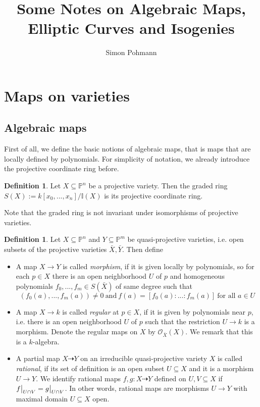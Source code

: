 \documentclass{scrartcl}
\title{Some Notes on Algebraic Maps, Elliptic Curves and Isogenies}
\author{Simon Pohmann}
\newcommand{\I}{\mathbb{I}}
\newcommand{\Proj}{\mathbb{P}}
\newcommand\restr[2]{{
    \left.\kern-\nulldelimiterspace
    #1
    \vphantom{\big|}
    \right|_{#2}
}}
\theoremstyle{definition}
\newtheorem{definition}[prop]{Definition}
\begin{document}
\maketitle

\tableofcontents

\section{Maps on varieties}

\subsection{Algebraic maps}
First of all, we define the basic notions of algebraic maps, that is maps that are locally defined by polynomials.
For simplicity of notation, we already introduce the projective coordinate ring before.
\begin{definition}
    Let $X \subseteq \Proj^n$ be a projective variety. 
    Then the graded ring $S(X) := k[x_0, ..., x_n] / \I(X)$ is its projective coordinate ring.
\end{definition}
Note that the graded ring is not invariant under isomorphisms of projective varieties.
\begin{definition}
    Let $X \subseteq \Proj^n$ and $Y \subseteq \Proj^m$ be quasi-projective varieties, i.e. open subsets of the projective varieties $\bar{X}, \bar{Y}$.
    Then define
    \begin{itemize}
        \item A map $X \to Y$ is called \emph{morphism}, if it is given locally by polynomials, so for each $p \in X$ there is an open neighborhood $U$ of $p$ and homogeneous polynomials $f_0, ..., f_m \in S(\bar{X})$ of same degree such that
        \begin{equation*}
            (f_0(a), ..., f_m(a)) \neq 0 \ \text{and} \ f(a) = [f_0(a) : ... : f_m(a)] \ \text{for all $a \in U$}
        \end{equation*}
        \item A map $X \to k$ is called \emph{regular} at $p \in X$, if it is given by polynomials near $p$, i.e. there is an open neighborhood $U$ of $p$ such that the restriction $U \to k$ is a morphism.
        Denote the regular maps on $X$ by $\mathcal{O}_{\bar{X}}(X)$.
        We remark that this is a $k$-algebra.
        \item A partial map $X \dashrightarrow Y$ on an irreducible quasi-projective variety $X$ is called \emph{rational}, if its set of definition is an open subset $U \subseteq X$ and it is a morphism $U \to Y$.
        We identify rational maps $f, g: X \dashrightarrow Y$ defined on $U, V \subseteq X$ if $\restr{f}{U \cap V} = \restr{g}{U \cap V}$.
        In other words, rational maps are morphisms $U \to Y$ with maximal domain $U \subseteq X$ open.
    \end{itemize}
\end{definition}
\end{document}
